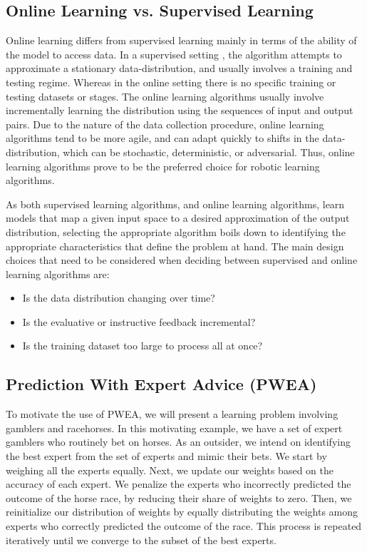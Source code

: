 \documentclass[11pt]{article}
\begin{document}
\subsection{Online Learning vs. Supervised Learning}
\normalfont
Online learning differs from supervised learning mainly in terms of the ability of the model to access data. In a supervised setting \cite{super}, the algorithm attempts to approximate a stationary data-distribution, and usually involves a training and testing regime. Whereas in the online setting there is no specific training or testing datasets or stages. The online learning algorithms usually involve incrementally learning the distribution using the sequences of input and output pairs. Due to the nature of the data collection procedure, online learning algorithms tend to be more agile, and can adapt quickly to shifts in the data-distribution, which can be stochastic, deterministic, or adversarial. Thus, online learning algorithms prove to be the preferred choice for robotic learning algorithms. 

As both supervised learning algorithms, and online learning algorithms, learn models that map a given input space to a desired approximation of the output distribution, selecting the appropriate algorithm boils down to identifying the appropriate characteristics that define the problem at hand. The main design choices that need to be considered when deciding between supervised and online learning algorithms are:
\begin{itemize}
  \item Is the data distribution changing over time?
  \item Is the evaluative or instructive feedback incremental?
  \item Is the training dataset too large to process all at once?
\end{itemize}

\subsection{Prediction With Expert Advice (PWEA)}
\normalfont
To motivate the use of PWEA, we will present a learning problem involving gamblers and racehorses. In this motivating example, we have a set of expert gamblers who routinely bet on horses. As an outsider, we intend on identifying the best expert from the set of experts and mimic their bets. We start by weighing all the experts equally. Next, we update our weights based on the accuracy of each expert. We penalize the experts who incorrectly predicted the outcome of the horse race, by reducing their share of weights to zero. Then, we reinitialize our distribution of weights by equally distributing the weights among experts who correctly predicted the outcome of the race. This process is repeated iteratively until we converge to the subset of the best experts.
\end{document}
